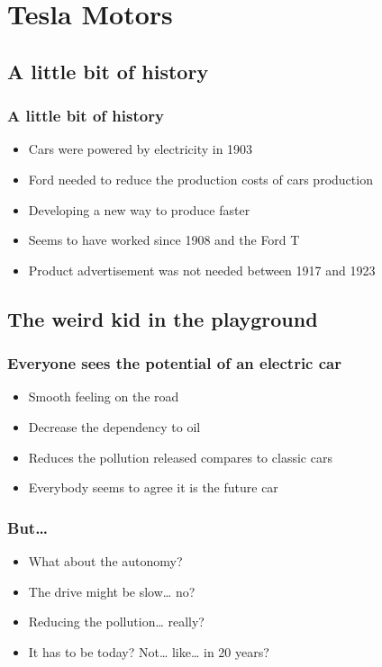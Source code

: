     \section{Tesla Motors}

\subsection{A little bit of history}
\begin{frame}
\frametitle{A little bit of history}
\begin{itemize}
    \itemsep1em
    \item Cars were powered by electricity in 1903
    \item Ford needed to reduce the production costs of cars production
    \item Developing a new way to produce faster %
    \item Seems to have worked since 1908 and the Ford T
    \item Product advertisement was not needed between 1917 and 1923
\end{itemize}
\end{frame}

\subsection{The weird kid in the playground}
\begin{frame}
\frametitle{Everyone sees the potential of an electric car}
\begin{itemize}
    \itemsep1.5em
    \item Smooth feeling on the road
    \item Decrease the dependency to oil
    \item Reduces the pollution released compares to classic cars
    \item Everybody seems to agree it is the future car
\end{itemize}
\end{frame}

\begin{frame}
\frametitle{But…}
\begin{itemize}
    \itemsep1.5em
    \item What about the autonomy?
    \item The drive might be slow… no?
    \item Reducing the pollution… really? %
    \item It has to be today? Not… like… in 20 years?
\end{itemize}
\end{frame}


